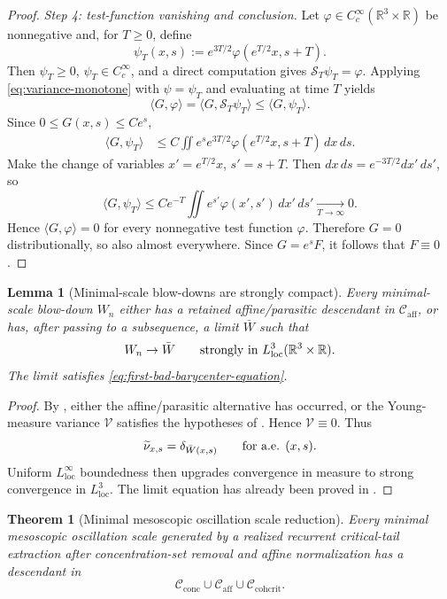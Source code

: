 \documentclass[11pt]{amsart}
\numberwithin{equation}{section}
\theoremstyle{plain}
\newtheorem{theorem}{Theorem}[section]
\newtheorem{lemma}[lemma]{Lemma}
\theoremstyle{definition}
\theoremstyle{remark}
\newcommand{\loc}{\mathrm{loc}}
\newcommand{\Cactive}{\mathcal C_{\mathrm{conc}}}
\newcommand{\Caff}{\mathcal C_{\mathrm{aff}}}
\newcommand{\Ccohcrit}{\mathcal C_{\mathrm{cohcrit}}}
\begin{document}
\begin{proof}
\emph{Step 4: test-function vanishing and conclusion.}  Let
\(\varphi\in C_c^\infty(\mathbb R^3\times\mathbb R)\) be nonnegative and, for
\(T\ge0\), define
\[
   \psi_T(x,s)
   :=
   e^{3T/2}\varphi(e^{T/2}x,s+T).
\]
Then \(\psi_T\ge0\), \(\psi_T\in C_c^\infty\), and a direct computation gives
\(\mathcal S_T\psi_T=\varphi\).  Applying \eqref{eq:variance-monotone} with
\(\psi=\psi_T\) and evaluating at time \(T\) yields
\[
   \langle G,\varphi\rangle
   =
   \langle G,\mathcal S_T\psi_T\rangle
   \le
   \langle G,\psi_T\rangle .
\]
Since \(0\le G(x,s)\le Ce^s\),
\[
\begin{aligned}
   \langle G,\psi_T\rangle
   &\le
   C\iint e^s e^{3T/2}\varphi(e^{T/2}x,s+T)\,dx\,ds .
\end{aligned}
\]
Make the change of variables \(x'=e^{T/2}x\), \(s'=s+T\).  Then
\(dx\,ds=e^{-3T/2}dx'\,ds'\), so
\[
   \langle G,\psi_T\rangle
   \le
   Ce^{-T}\iint e^{s'}\varphi(x',s')\,dx'\,ds'
   \xrightarrow[T\to\infty]{}0 .
\]
Hence \(\langle G,\varphi\rangle=0\) for every nonnegative test function
\(\varphi\).  Therefore \(G=0\) distributionally, so also almost everywhere.
Since \(G=e^sF\), it follows that \(F\equiv0\).
\end{proof}

\begin{lemma}[Minimal-scale blow-downs are strongly compact]
\label{lem:first-bad-strong-compactness}
Every minimal-scale blow-down \(W_n\) either has a retained affine/parasitic
descendant in \(\Caff\), or has, after passing to a subsequence, a limit
\(\bar W\) such that
\[
   W_n\to\bar W
   \qquad\hbox{strongly in }L^3_{\loc}(\mathbb R^3\times\mathbb R).
\]
The limit satisfies \eqref{eq:first-bad-barycenter-equation}.
\end{lemma}

\begin{proof}
By , either the affine/parasitic alternative
has occurred, or the Young-measure variance \(\mathcal V\) satisfies the
hypotheses of
.  Hence \(\mathcal V\equiv0\).  Thus
\[
   \widetilde\nu_{x,s}=\delta_{\bar W(x,s)}
   \qquad\hbox{for a.e. }(x,s).
\]
Uniform \(L^\infty_{\loc}\) boundedness then upgrades convergence in measure to
strong convergence in \(L^3_{\loc}\).  The limit equation has already been
proved in .
\end{proof}

\begin{theorem}[Minimal mesoscopic oscillation scale reduction]
\label{thm:first-bad-mesoscopic-reduction}
Every minimal mesoscopic oscillation scale generated by a realized recurrent
critical-tail extraction after concentration-set removal and affine normalization
has a descendant in
\[
   \Cactive\cup\Caff\cup\Ccohcrit .
\]
\end{theorem}
\end{document}

